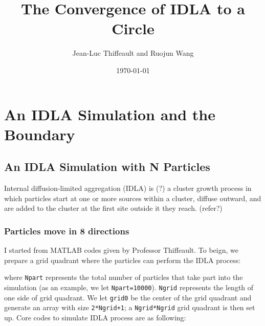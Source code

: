 \documentclass[letterpaper]{article}
\title{	
	\normalfont \normalsize 
	\huge The Convergence of IDLA to a Circle \\ %
}
\author{Jean-Luc Thiffeault and Ruojun Wang} %
\date{\normalsize\today} %
\numberwithin{equation}{section} %
\numberwithin{figure}{section} %
\numberwithin{table}{section} %
\begin{document}
	
\maketitle %
	

\section{An IDLA Simulation and the Boundary}

\subsection{An IDLA Simulation with N Particles}

Internal diffusion-limited aggregation (IDLA) is (?) a cluster growth process in which particles start at one or more sources within a cluster, diffuse outward, and are added to the cluster at the first site outside it they reach. (refer?) 

\subsubsection{Particles move in 8 directions}
I started from  MATLAB codes given by Professor Thiffeault. To beign, we prepare a grid quadrant where the particles can perform the IDLA process:




\noindent
where \texttt{Npart} represents the total number of particles that take part into the simulation (as an example, we let \texttt{Npart=10000}). \texttt{Ngrid} represents the length of one side of grid quadrant. We let \texttt{grid0} be the center of the grid quadrant and generate an array with size \texttt{2*Ngrid+1}; a \texttt{Ngrid*Ngrid} grid quadrant is then set up. Core codes to simulate IDLA process are as following: 

\end{document}
